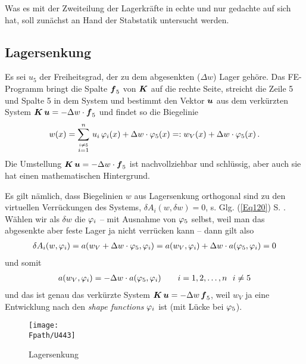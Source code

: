 {{{Was es mit der Zweiteilung der Lagerkr\"{a}fte in \glq echte\grq{} und \glq nur gedachte\grq{} auf sich hat, soll zun\"{a}chst an Hand der Stabstatik untersucht werden.

{\textcolor{sectionTitleBlue}{\section{Lagersenkung}}}\label{Korrektur17}
Es sei $u_5$ der Freiheitsgrad, der zu dem abgesenkten ($\Delta w$) Lager geh\"{o}re. Das FE-Programm bringt die Spalte $\mbox{\boldmath $f$}_5$ von $\mbox{\boldmath $K$}$ auf die rechte Seite, streicht die Zeile 5 und Spalte 5 in dem System und bestimmt den Vektor $\mbox{\boldmath $u$}$ aus dem verk\"{u}rzten System $\mbox{\boldmath $K$}\,\mbox{\boldmath $u$} = - \Delta w\cdot \mbox{\boldmath $f$}_5$ und findet so die Biegelinie
\begin{align}
w(x) = \sum_{\stackrel{i \neq 5}{i = 1}}^n\, u_i\,\varphi_i(x) + \Delta w \cdot \varphi_5(x) =: w_V(x) + \Delta w \cdot \varphi_5(x)\,.
\end{align}
Die Umstellung  $\mbox{\boldmath $K$}\,\mbox{\boldmath $u$} = - \Delta w \cdot \mbox{\boldmath $f$}_5$ ist nachvollziehbar und schl\"{u}ssig, aber auch sie hat einen mathematischen Hintergrund.

Es gilt n\"{a}mlich, dass Biegelinien $w$ aus Lagersenkung orthogonal sind zu den virtuellen Verr\"{u}ckungen des Systems, $\delta A_i(w,\delta w) = 0$, s. Glg. (\ref{Eq120}) S. \pageref{Eq120}. W\"{a}hlen wir als $\delta w$ die $\varphi_i$ -- mit Ausnahme von $\varphi_5$ selbst, weil man das abgesenkte aber feste Lager ja nicht verr\"{u}cken kann -- dann gilt also
\begin{align}
\delta A_i(w,\varphi_i) = a(w_V + \Delta w \cdot \varphi_5,\varphi_i) = a(w_V,\varphi_i) + \Delta w \cdot a(\varphi_5,\varphi_i) = 0
\end{align}
und somit
\begin{align}
a(w_V,\varphi_i) = - \Delta w \cdot a(\varphi_5,\varphi_i) \qquad i = 1,2,\ldots, n \,\,\,\, i \neq 5
\end{align}
und das ist genau das verk\"{u}rzte System $\mbox{\boldmath $K$}\,\mbox{\boldmath $u$} = -\Delta w \,\mbox{\boldmath $f$}_5$, weil $w_V$ ja eine Entwicklung nach den {\em shape functions\/} $\varphi_i$ ist (mit L\"{u}cke bei $\varphi_5$).
\begin{figure}[tbp]
\centering
\texttt{[image: \\Fpath/U443]}
\caption{Lagersenkung} \label{U443}
\end{figure}%

}}}
